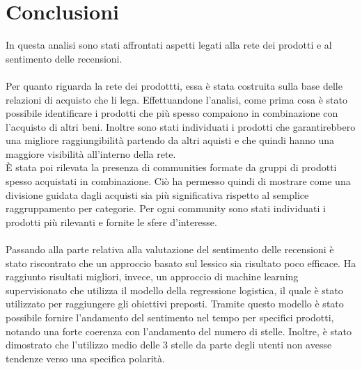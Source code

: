 \section{Conclusioni}\label{Conclusioni}
In questa analisi sono stati affrontati aspetti legati alla rete dei prodotti e al sentimento delle recensioni. 
\\\\
Per quanto riguarda la rete dei prodottti, essa è stata costruita sulla base delle relazioni di acquisto che li lega. Effettuandone l'analisi, come prima cosa è stato possibile identificare i prodotti che più spesso compaiono in combinazione con l'acquisto di altri beni. Inoltre sono stati individuati i prodotti che garantirebbero una migliore raggiungibilità partendo da altri aquisti e che quindi hanno una maggiore visibilità all'interno della rete. \\
È stata poi rilevata la presenza di communities formate da gruppi di prodotti spesso acquistati in combinazione. Ciò ha permesso quindi di mostrare come una divisione guidata dagli acquisti sia più significativa rispetto al semplice raggruppamento per categorie. Per ogni community sono stati individuati i prodotti più rilevanti e fornite le sfere d'interesse. 
\\\\
Passando alla parte relativa alla valutazione del sentimento delle recensioni è stato riscontrato che un approccio basato sul lessico sia risultato poco efficace. Ha raggiunto risultati migliori, invece, un approccio di machine learning supervisionato che utilizza il modello della regressione logistica, il quale è stato utilizzato per raggiungere gli obiettivi preposti. Tramite questo modello è stato possibile fornire l'andamento del sentimento nel tempo per specifici prodotti, notando una forte coerenza con l'andamento del numero di stelle. Inoltre, è stato dimostrato che l'utilizzo medio delle 3 stelle da parte degli utenti non avesse tendenze verso una specifica polarità. 
\\\\
